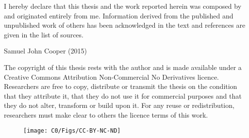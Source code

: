 \vspace*{\fill}
\begin{center}
I hereby declare that this thesis and the work reported herein was composed by and originated entirely from me. Information derived from the published and unpublished work of others has been acknowledged in the text and references are given in the list of sources.

\begin{flushright}
Samuel John Cooper (2015)
\end{flushright}
\end{center}
\vspace*{\fill}

The copyright of this thesis rests with the author and is made available under a Creative Commons Attribution Non-Commercial No Derivatives licence. Researchers are free to copy, distribute or transmit the thesis on the condition that they attribute it, that they do not use it for commercial purposes and that they do not alter, transform or build upon it. For any reuse or redistribution, researchers must make clear to others the licence terms of this work.
\begin{figure}
\begin{flushright}
\texttt{[image: C0/Figs/CC-BY-NC-ND]}
\end{flushright}
\end{figure}
